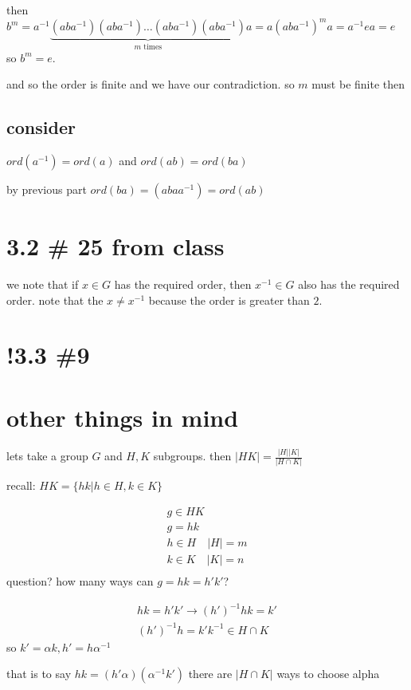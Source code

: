 \documentclass[letterpaper]{article}
\begin{document}
then $b^m=a^{-1}\underbrace{(aba^{-1})(aba^{-1})\dots(aba^{-1})(aba^{-1})}_{m\text{ times}}a=a(aba^{-1})^ma=a^{-1}ea=e$ so $b^m=e$.

and so the order is finite and we have our contradiction. so $m$ must be finite then
\subsection*{consider}
$ord(a^{-1})=ord(a)$ and $ord(ab)=ord(ba)$

by previous part $ord(ba)=(abaa^{-1})=ord(ab)$

\section*{3.2 \# 25 from class}
we note that if $x\in G$ has the required order, then $x^{-1}\in G$ also has the required order. note that the $x\ne x^{-1}$ because the order is greater than $2$.

\section*{!3.3 \#9}

\section*{other things in mind}
lets take a group $G$ and $H,K$ subgroups. then $\left\lvert HK\right\rvert=\frac{|H||K|}{|H\cap K|}$

recall: $HK=\{hk|h\in H, k\in K\}$

\begin{align*}
  g\in HK\\
  g=hk\\
  h\in H\quad |H|=m\\
  k\in K\quad |K|=n\\
\end{align*}
question? how many ways can $g=hk=h'k'$?

\begin{align*}
  hk=h'k'\to(h')^{-1}hk=k'\\
  (h')^{-1}h=k'k^{-1}\in H\cap K
\end{align*}
so $k'=\alpha k, h'=h\alpha^{-1}$

that is to say $hk=(h'\alpha)(\alpha^{-1}k')$
there are $|H\cap K|$ ways to choose alpha
\end{document}

